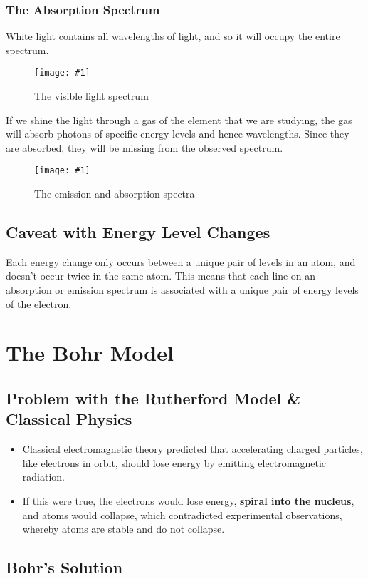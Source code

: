 \documentclass[a4paper,12pt]{article}
\let\oldsection\section
\renewcommand\section{\clearpage\oldsection}
\newcommand{\img}[4]{\begin{center}
  \begin{figure}[H]
    \centering
    \texttt{[image: \#1]}
    \caption{#3}
    \label{fig:#4}
  \end{figure}
\end{center}}
\begin{document}
\subsubsection{The Absorption Spectrum}

White light contains all wavelengths of light, and so it will occupy the entire spectrum.

\img{visiblelight.png}{0.4}{The visible light spectrum}{visiblelight}

If we shine the light through a gas of the element that we are studying, the gas will absorb photons of specific energy levels and hence wavelengths. Since they are absorbed, they will be missing from the observed spectrum.

\img{spectracompare.jpg}{0.5}{The emission and absorption spectra}{spectracompare}

\subsection{Caveat with Energy Level Changes}

Each energy change only occurs between a unique pair of levels in an atom, and doesn't occur twice in the same atom. This means that each line on an absorption or emission spectrum is associated with a unique pair of energy levels of the electron.




\section{The Bohr Model}

\subsection{Problem with the Rutherford Model \& Classical Physics}

\begin{itemize}
  \item Classical electromagnetic theory predicted that accelerating charged particles, like electrons in orbit, should lose energy by emitting electromagnetic radiation.
  \item If this were true, the electrons would lose energy, \textbf{spiral into the nucleus}, and atoms would collapse, which contradicted experimental observations, whereby atoms are stable and do not collapse.
\end{itemize}

\subsection{Bohr's Solution}
\end{document}
